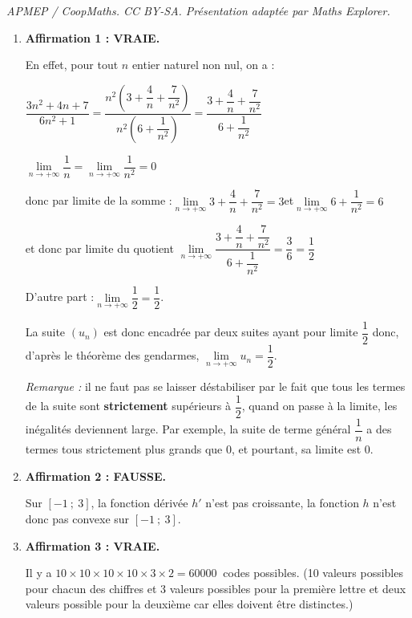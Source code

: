 \documentclass[10pt]{article}
\providecommand{\np}[2][]{{#2~#1}}
\begin{document}
\noindent\textit{APMEP / CoopMaths. CC BY-SA. Présentation adaptée par Maths Explorer.}\par\medskip
\begin{enumerate}
	\item \textbf{Affirmation 1 : VRAIE.}

	En effet, pour tout $n$ entier naturel non nul, on a :

	$\dfrac{3n^2+4n+7}{6n^2+1}= \dfrac{n^2 \left(3+\dfrac{4}{n}+\dfrac{7}{n^2}\right)}{n^2 \left(6+\dfrac{1}{n^2}\right)}= \dfrac{3+\dfrac{4}{n}+\dfrac{7}{n^2}}{6+\dfrac{1}{n^2}}$

	$\lim\limits_{n\to +\infty} \dfrac{1}{n}=\lim\limits_{n\to +\infty} \dfrac{1}{n^2}=0$

	donc par limite de la somme :\quad $\lim\limits_{n \to +\infty} 3+\dfrac{4}{n}+\dfrac{7}{n^2}=3$\quad et\quad $\lim\limits_{n \to +\infty} 6+\dfrac{1}{n^2}=6$

	et donc par limite du quotient \quad$\lim\limits_{n\to +\infty } \dfrac{3+\dfrac{4}{n}+\dfrac{7}{n^2}}{6+\dfrac{1}{n^2}} = \dfrac{3}{6}=\dfrac{1}{2}$

	D'autre part :\quad $\lim\limits_{n\to +\infty} \dfrac{1}{2}=\dfrac{1}{2}$.

	La suite $\left(u_n\right)$ est donc encadrée par deux suites ayant pour limite $\dfrac{1}{2}$ donc, d'après le théorème des gendarmes, $\lim\limits_{n\to +\infty} u_n=\dfrac{1}{2}$.

	\emph{Remarque :} il ne faut pas se laisser déstabiliser par le fait que tous les termes de la suite sont \textbf{strictement} supérieurs à $\dfrac{1}{2}$, quand on \og passe à la limite\fg{}, les inégalités deviennent large. Par exemple, la suite de terme général $\dfrac{1}{n}$ a des termes tous strictement plus grands que 0, et pourtant, sa limite est 0.


	\item  \textbf{Affirmation 2 : FAUSSE.}

Sur $[-1~;~3]$, la fonction dérivée $h'$ n'est pas croissante, la fonction $h$ n'est donc pas convexe sur $[-1~;~3]$.

	\item \textbf{Affirmation 3 : VRAIE.}

Il y a $10 \times 10 \times 10 \times 10 \times 3 \times 2 = \np{60000}$ codes possibles.  (10 valeurs possibles pour chacun des chiffres et 3 valeurs possibles pour la première lettre et deux valeurs possible pour la deuxième car elles doivent être distinctes.)


\end{enumerate}
\end{document}
